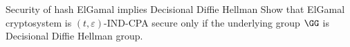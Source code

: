 \documentclass{crypto-exercise}
\author{Sven Laur}
\begin{document}
\begin{exercise}{Security of hash ElGamal implies Decisional Diffie Hellman}
Show that ElGamal cryptosystem is $(t,\varepsilon)$-IND-CPA secure only if the underlying group $\GG$ is Decisional Diffie Hellman group.
\end{exercise}


\begin{solution}
\end{solution}
\end{document}
